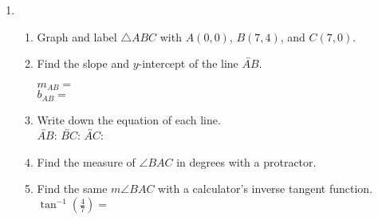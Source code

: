\documentclass[12pt, twoside]{article}
\begin{document}
\begin{enumerate}
\newpage
    \item \begin{enumerate}
    \item Graph and label $\triangle ABC$ with $A(0,0)$, $B(7,4)$, and $C(7,0)$.
    \begin{center}
    \end{center}
    \item Find the slope and $y$-intercept of the line $\overleftrightarrow{AB}$.
        \begin{multicols}{2}
        $m_{AB}=$ \\
        $b_{AB}=$
        \end{multicols} \vspace{0.5cm}
    \item Write down the equation of each line. \\[0.5cm]
        $\overleftrightarrow{AB}$: \hfill
        $\overleftrightarrow{BC}$: \hfill
        $\overleftrightarrow{AC}$: \hspace{2cm}
    \vspace{2cm}
    \item Find the measure of $\angle BAC$ in degrees with a protractor. \vspace{0.5cm}
    \item Find the same $m\angle BAC$ with a calculator's inverse tangent function.\\[0.5cm]
    $\displaystyle \tan^{-1}(\frac{4}{7})=$
    \vspace{2cm}
    \end{enumerate}
    
\end{enumerate}
\end{document}
